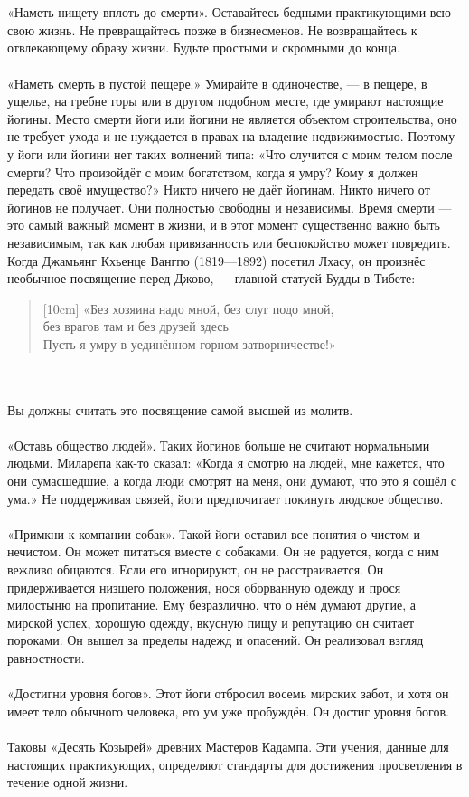 \\ \\ «Наметь нищету вплоть до смерти». Оставайтесь бедными практикующими всю свою жизнь. Не превращайтесь позже в бизнесменов. Не возвращайтесь к отвлекающему образу жизни. Будьте простыми и скромными до конца.
\newpage
\\ \\ «Наметь смерть в пустой пещере.» Умирайте в одиночестве, — в пещере, в ущелье, на гребне горы или в другом подобном месте, где умирают настоящие йогины. Место смерти йоги или йогини не является объектом строительства, оно не требует ухода и не нуждается в правах на владение недвижимостью. Поэтому у йоги или йогини нет таких волнений типа: «Что случится с моим телом после смерти? Что произойдёт с моим богатством, когда я умру? Кому я должен передать своё имущество?» Никто ничего не даёт йогинам. Никто ничего от йогинов не получает. Они полностью свободны и независимы. Время смерти — это самый важный момент в жизни, и в этот момент существенно важно быть независимым, так как любая привязанность или беспокойство может повредить. Когда Джамьянг Кхьенце Вангпо (1819—1892) посетил Лхасу, он произнёс необычное посвящение перед Джово, — главной статуей Будды в Тибете:
\begin{verse}[10cm]
«Без хозяина надо мной, без слуг подо мной, \\
\indent без врагов там и без друзей здесь\\
Пусть я умру в уединённом горном затворничестве!»
\end{verse}
\\ \\ Вы должны считать это посвящение самой высшей из молитв.
\\ \\ «Оставь общество людей». Таких йогинов больше не считают нормальными людьми. Миларепа как-то сказал: «Когда я смотрю на людей, мне кажется, что они сумасшедшие, а когда люди смотрят на меня, они думают, что это я сошёл с ума.» Не поддерживая связей, йоги предпочитает покинуть людское общество.
\\ \\ «Примкни к компании собак». Такой йоги оставил все понятия о чистом и нечистом. Он может питаться вместе с собаками. Он не радуется, когда с ним вежливо общаются. Если его игнорируют, он не расстраивается. Он придерживается низше\-го положения, нося оборванную одежду и прося милостыню на пропитание. Ему безразлично, что о нём думают другие, а мирской успех, хорошую одежду, вкусную пищу и репутацию он считает пороками. Он вышел за пределы надежд и опасений. Он реализовал взгляд равностности.
\\ \\ «Достигни уровня богов». Этот йоги отбросил восемь мирских забот, и хотя он имеет тело обычного человека, его ум уже пробуждён. Он достиг уровня богов.
\\ \\ Таковы «Десять Козырей» древних Мастеров Кадампа. Эти учения, данные для настоящих практикующих, определяют стандарты для достижения просветления в течение одной жизни.
